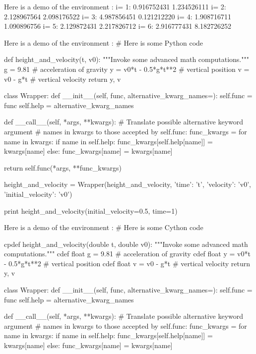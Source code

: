 \noindent
Here is a demo of the environment :
i= 1:  0.916752431  1.234526111
i= 2:  2.128967564  2.098176522
i= 3:  4.987856451  0.121212220
i= 4:  1.908716711  1.090896756
i= 5:  2.129872431  2.217826712
i= 6:  2.916777431  8.182726252

\noindent
Here is a demo of the environment :
# Here is some Python code

def height_and_velocity(t, v0):
    """Invoke some advanced math computations."""
    g = 9.81                  # acceleration of gravity
    y = v0*t - 0.5*g*t**2     # vertical position
    v = v0 - g*t              # vertical velocity
    return y, v

class Wrapper:
    def __init__(self, func, alternative_kwarg_names={}):
        self.func = func
        self.help = alternative_kwarg_names

    def __call__(self, *args, **kwargs):
        # Translate possible alternative keyword argument
        # names in kwargs to those accepted by self.func:
        func_kwargs = {}
        for name in kwargs:
            if name in self.help:
                func_kwargs[self.help[name]] = kwargs[name]
            else:
                func_kwargs[name] = kwargs[name]

        return self.func(*args, **func_kwargs)

height_and_velocity = Wrapper(height_and_velocity,
                              {'time': 't',
                               'velocity': 'v0',
                               'initial_velocity': 'v0'})

print height_and_velocity(initial_velocity=0.5, time=1)


\noindent
Here is a demo of the environment :
# Here is some Cython code

cpdef height_and_velocity(double t, double v0):
    """Invoke some advanced math computations."""
    cdef float g = 9.81                  # acceleration of gravity
    cdef float y = v0*t - 0.5*g*t**2     # vertical position
    cdef float v = v0 - g*t              # vertical velocity
    return y, v

class Wrapper:
    def __init__(self, func, alternative_kwarg_names={}):
        self.func = func
        self.help = alternative_kwarg_names

    def __call__(self, *args, **kwargs):
        # Translate possible alternative keyword argument
        # names in kwargs to those accepted by self.func:
        func_kwargs = {}
        for name in kwargs:
            if name in self.help:
                func_kwargs[self.help[name]] = kwargs[name]
            else:
                func_kwargs[name] = kwargs[name]


